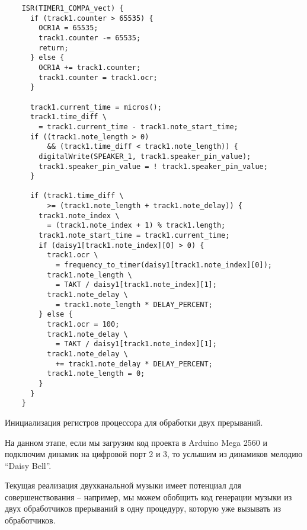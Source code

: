 \documentclass[../sparc.tex]{subfiles}
\begin{document}
\begin{listing}[H]
  \begin{verbatim}
    ISR(TIMER1_COMPA_vect) {
      if (track1.counter > 65535) {
        OCR1A = 65535;
        track1.counter -= 65535;
        return;
      } else {
        OCR1A += track1.counter;
        track1.counter = track1.ocr;
      }

      track1.current_time = micros();
      track1.time_diff \
        = track1.current_time - track1.note_start_time;
      if ((track1.note_length > 0)
          && (track1.time_diff < track1.note_length)) {
        digitalWrite(SPEAKER_1, track1.speaker_pin_value);
        track1.speaker_pin_value = ! track1.speaker_pin_value;
      }

      if (track1.time_diff \
          >= (track1.note_length + track1.note_delay)) {
        track1.note_index \
          = (track1.note_index + 1) % track1.length;
        track1.note_start_time = track1.current_time;
        if (daisy1[track1.note_index][0] > 0) {
          track1.ocr \
            = frequency_to_timer(daisy1[track1.note_index][0]);
          track1.note_length \
            = TAKT / daisy1[track1.note_index][1];
          track1.note_delay \
            = track1.note_length * DELAY_PERCENT;
        } else {
          track1.ocr = 100;
          track1.note_delay \
            = TAKT / daisy1[track1.note_index][1];
          track1.note_delay \
            += track1.note_delay * DELAY_PERCENT;
          track1.note_length = 0;
        }
      }
    }
  \end{verbatim}
  \caption{Инициализация регистров процессора для обработки двух прерываний.}
  \label{listing:mcu-music-17}
\end{listing}

На данном этапе, если мы загрузим код проекта в Arduino Mega 2560 и подключим
динамик на цифровой порт 2 и 3, то услышим из динамиков мелодию ``Daisy Bell''.

Текущая реализация двухканальной музыки имеет потенциал для совершенствования --
например, мы можем обобщить код генерации музыки из двух обработчиков прерываний
в одну процедуру, которую уже вызывать из обработчиков.
\end{document}
